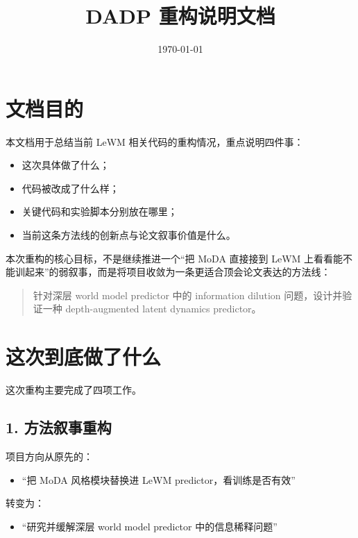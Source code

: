 \documentclass[UTF8,a4paper,11pt]{ctexart}
\title{DADP 重构说明文档}
\author{}
\date{\today}
\begin{document}
\maketitle

\section{文档目的}

本文档用于总结当前 LeWM 相关代码的重构情况，重点说明四件事：

\begin{itemize}[leftmargin=2em]
  \item 这次具体做了什么；
  \item 代码被改成了什么样；
  \item 关键代码和实验脚本分别放在哪里；
  \item 当前这条方法线的创新点与论文叙事价值是什么。
\end{itemize}

本次重构的核心目标，不是继续推进一个“把 MoDA 直接接到 LeWM 上看看能不能训起来”的弱叙事，而是将项目收敛为一条更适合顶会论文表达的方法线：

\begin{quote}
针对深层 world model predictor 中的 information dilution 问题，设计并验证一种 depth-augmented latent dynamics predictor。
\end{quote}

\section{这次到底做了什么}

这次重构主要完成了四项工作。

\subsection{1. 方法叙事重构}

项目方向从原先的：

\begin{itemize}[leftmargin=2em]
  \item “把 MoDA 风格模块替换进 LeWM predictor，看训练是否有效”
\end{itemize}

转变为：

\begin{itemize}[leftmargin=2em]
  \item “研究并缓解深层 world model predictor 中的信息稀释问题”
\end{itemize}
\end{document}
